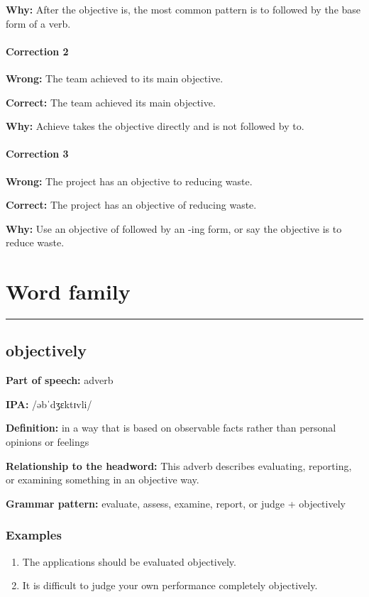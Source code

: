 \documentclass[11pt]{article}
\newcommand{\sectionrule}{\par\vspace{-0.5em}\noindent\textcolor{Accent}{\rule{\linewidth}{0.6pt}}\par}
\begin{document}
\textbf{Why:} After the objective is, the most common pattern is to followed by the base form of a verb.

\paragraph{Correction 2}
\textbf{Wrong:} The team achieved to its main objective.

\textbf{Correct:} The team achieved its main objective.

\textbf{Why:} Achieve takes the objective directly and is not followed by to.

\paragraph{Correction 3}
\textbf{Wrong:} The project has an objective to reducing waste.

\textbf{Correct:} The project has an objective of reducing waste.

\textbf{Why:} Use an objective of followed by an -ing form, or say the objective is to reduce waste.

\section{Word family}
\sectionrule
\subsection{objectively}
\textbf{Part of speech:} adverb

\textbf{IPA:} /əbˈdʒɛktɪvli/

\textbf{Definition:} in a way that is based on observable facts rather than personal opinions or feelings

\textbf{Relationship to the headword:} This adverb describes evaluating, reporting, or examining something in an objective way.

\textbf{Grammar pattern:} evaluate, assess, examine, report, or judge + objectively

\subsubsection{Examples}
\begin{enumerate}
  \item The applications should be evaluated objectively.
  \item It is difficult to judge your own performance completely objectively.
\end{enumerate}
\end{document}
